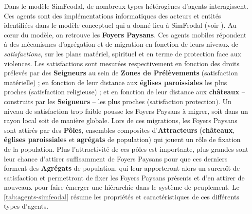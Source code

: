 Dans le modèle SimFeodal, de nombreux types hétérogènes d'agents interagissent. Ces agents sont des implémentations informatiques des acteurs et entités identifiées dans le modèle conceptuel qui a donné lieu à SimFeodal (voir \textcite[Tableau 1, \ppno~309--310]{cura_transition_2017}).
Au cœur du modèle, on retrouve les \textbf{Foyers Paysans}. Ces agents mobiles répondent à des mécanismes d'agrégation et de migration en fonction de leurs niveaux de \textit{satisfactions}, sur les plans matériel, spirituel et en terme de protection face aux violences.
Les satisfactions sont mesurées respectivement en fonction des droits prélevés par des \textbf{Seigneurs} au sein de \textbf{Zones de Prélèvements} (satisfaction matérielle) ; en fonction de leur distance aux \textbf{églises paroissiales} les plus proches (satisfaction religieuse) ; et en fonction de leur distance aux \textbf{châteaux} -- construits par les \textbf{Seigneurs} -- les plus proches (satisfaction protection).
Un niveau de satisfaction trop faible pousse les Foyers Paysans à migrer, soit dans un rayon local soit de manière globale.
Lors de ces migrations, les Foyers Paysans sont attirés par des \textbf{Pôles}, ensembles composites d'\textbf{Attracteurs} (\textbf{châteaux}, \textbf{églises paroissiales} et \textbf{agrégats} de population) qui jouent un rôle de fixation de la population.
Plus l'attractivité de ces pôles est importante, plus grandes sont leur chance d'attirer suffisamment de Foyers Paysans pour que ces derniers forment des \textbf{Agrégats} de population, qui leur apporteront alors un surcroît de satisfaction et permettront de fixer les Foyers Paysans présents et d'en attirer de nouveaux pour faire émerger une hiérarchie dans le système de peuplement.
Le \cref{tab:agents-simfeodal} résume les propriétés et caractéristiques de ces différents types d'agents.


